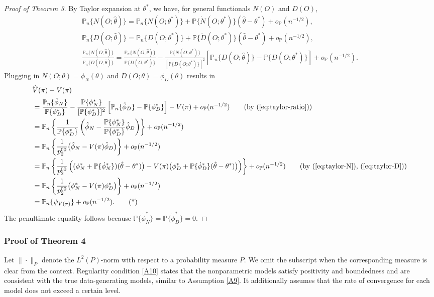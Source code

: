 \documentclass{article}
\newcommand{\wh}{\widehat}
\newcommand{\pr}{\mathbb{P}}
\begin{document}
\begin{proof}[Proof of Theorem 3]
By Taylor expansion at $\theta^*$, we have, for general functionals $N(O)$ and $D(O)$,
\begin{gather}
	\pr_n\{ N(O; \hat\theta) \} = \pr_n\{ N(O; \theta^*) \} + \pr\{ \dot N(O; \theta^*) \} (\hat\theta - \theta^*) + o_{\pr}(n^{-1/2}),
	\label{eq:taylor-N} \\
	\pr_n\{ D(O; \hat\theta) \} = \pr_n\{ D(O; \theta^*) \} + \pr\{ \dot D(O; \theta^*) \} (\hat\theta - \theta^*) + o_{\pr}(n^{-1/2}),
	\label{eq:taylor-D} \\
	    \frac{\pr_n\{ N(O; \hat\theta) \}}{\pr_n\{ D(O; \hat\theta) \}} = \frac{\pr_n\{ N(O; \hat\theta) \}}{\pr\{ D(O; \theta^*) \}} - \frac{\pr\{ N(O; \theta^*) \}}{[\pr\{ D(O; \theta^*) \}]^2} \left[ \pr_n\{ D(O; \hat\theta) \} - \pr\{ D(O; \theta^*) \} \right] + o_{\pr}(n^{-1/2}).
	\label{eq:taylor-ratio}
\end{gather}
Plugging in $N(O;\theta) = \phi_N(\theta)$ and $D(O;\theta) = \phi_D(\theta)$ results in
\begin{align*}
	&\wh V(\pi) - V(\pi) \\
	&= \frac{\pr_n\{ \hat\phi_N \}}{\pr\{ \phi_D^* \}} - \frac{\pr\{ \phi_N^* \}}{[\pr\{ \phi_D^* \}]^2} \left[ \pr_n\{ \hat\phi_D \} - {\pr\{ \phi_D^* \}} \right] - {V(\pi)} + o_{\pr}(n^{-1/2}) 
	  \tag{by (\ref{eq:taylor-ratio})} \\
	&= \pr_n \left\{ \frac1{\pr\{\phi_D^*\}} \left( \hat\phi_N - \frac{\pr\{ \phi_N^* \}}{\pr\{ \phi_D^* \}} \hat\phi_D \right) \right\} + o_{\pr}(n^{-1/2}) \\
	&= \pr_n \left\{ \frac1{p_2^{00}} \big( \hat\phi_N -V(\pi) \hat\phi_D \big) \right\} + o_{\pr}(n^{-1/2}) \\
	&= \pr_n \left\{ \frac1{p_2^{00}} \left( (\phi_N^* + {\pr \{ \dot\phi_N^* \})(\hat\theta-\theta^*)}\big) -V(\pi) \big(\phi_D^* + {\pr\{\dot\phi_D^*\}(\hat\theta-\theta^*)}\big) \right) \right\} + o_{\mathbb P }(n^{-1/2})  
	  \tag{by (\ref{eq:taylor-N}), (\ref{eq:taylor-D})} \\
	&= \pr_n \left\{ \frac1{p_2^{00}} \big( \phi_N^* -V(\pi) \phi_D^* \big) \right\} + o_{\pr}(n^{-1/2}) \\
	&= \pr_n \{ {\psi}_{V(\pi)}\} + o_{\pr}(n^{-1/2}). \tag{*} \label{eq:clt-form}
\end{align*}
The penultimate equality follows because $\pr\{\dot\phi_N^*\} = \pr\{\dot\phi_D^*\}=0.$  
\end{proof}


%
\subsubsection{Proof of Theorem 4}
Let $\|\cdot\|_P$ denote the $L^2(P)$-norm with respect to a probability measure $P$. We omit the subscript when the corresponding measure is clear from the context.
Regularity condition \ref{A10} states that the nonparametric models satisfy positivity and boundedness and are consistent with the true data-generating models, similar to Assumption \ref{A9}. It additionally assumes that the rate of convergence for each model does not exceed a certain level.
\end{document}

